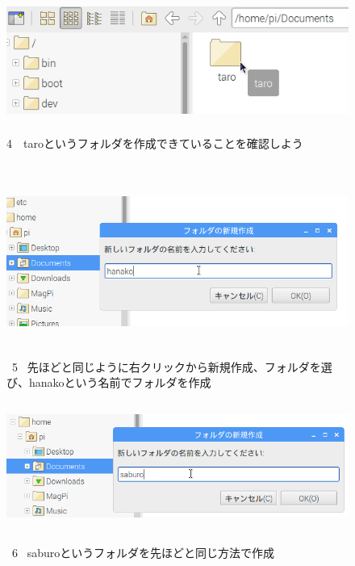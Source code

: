 \documentclass[a4paper,12pt]{jarticle}
\begin{document}
\begin{figure}[ht]
  \centering
  \includegraphics[width=12.659cm,height=3.972cm]{textbook-img040.png}
  \begin{minipage}{\textwidth}
    4　taroというフォルダを作成できていることを確認しよう
  \end{minipage}

\end{figure}
\clearpage
\begin{figure}
  \\
  \vspace{10mm}
  \centering
  \includegraphics[width=14.289cm,height=5.431cm]{textbook-img041.png}
  \begin{minipage}{\textwidth}
    \ 5
    \ 先ほどと同じように右クリックから新規作成、フォルダを選び、hanakoという名前でフォルダを作成
  \end{minipage}

  \centering
  \includegraphics[width=13.884cm,height=4.189cm]{textbook-img042.png}
  \begin{minipage}{\textwidth}
    \ 6
    \ saburoというフォルダを先ほどと同じ方法で作成
  \end{minipage}


\end{figure}
\end{document}
